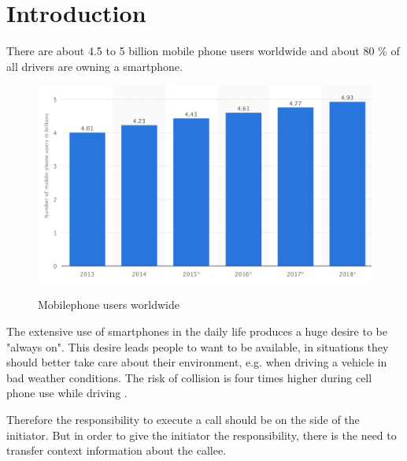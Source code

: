 \documentclass{sigchi}
\begin{document}


\section{Introduction}
There are about 4.5 to 5 billion mobile phone users worldwide \cite{stat14} and about 80 \% of all drivers are owning a smartphone.
\begin{figure}[H]
	\centering
	\includegraphics[width=.95\linewidth]{figures/worldwide_phoneuser}
	\caption{Mobilephone users worldwide} \cite{stat14}
	\label{fig:app_worldwide}
\end{figure} The extensive use of smartphones in the daily life produces a huge desire to be "always on". This desire leads people to want to be available, in situations they should better take care about their environment, e.g. when driving a vehicle in bad weather conditions. The risk of collision is four times higher during cell phone use while driving \cite{iihs05}.

Therefore the responsibility to execute a call should be on the side of the initiator. But in order to give the initiator the responsibility, there is the need to transfer context information about the callee.
\end{document}
